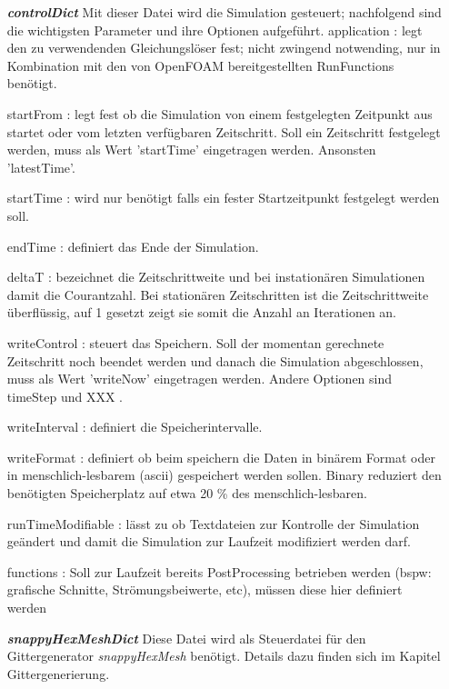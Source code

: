 \begin{itemize}
	
	\item[\textbf{\textit{controlDict}}] Mit dieser Datei wird die Simulation gesteuert; nachfolgend sind die wichtigsten Parameter und ihre Optionen aufgeführt.
		\subitem application : legt den zu verwendenden Gleichungslöser fest; nicht zwingend notwending, nur in Kombination mit den von OpenFOAM bereitgestellten RunFunctions benötigt.
		
		\subitem startFrom : legt fest ob die Simulation von einem festgelegten Zeitpunkt aus startet oder vom letzten verfügbaren Zeitschritt. Soll ein Zeitschritt festgelegt werden, muss als Wert 'startTime' eingetragen werden. Ansonsten 'latestTime'. 
		
		\subitem startTime : wird nur benötigt falls ein fester Startzeitpunkt festgelegt werden soll. 
		
		\subitem endTime : definiert das Ende der Simulation. 
		
		\subitem deltaT : bezeichnet die Zeitschrittweite und bei instationären Simulationen damit die Courantzahl. Bei stationären Zeitschritten ist die Zeitschrittweite überflüssig, auf 1 gesetzt zeigt sie somit die Anzahl an Iterationen an. 
		
		\subitem writeControl : steuert das Speichern. Soll der momentan gerechnete Zeitschritt noch beendet werden und danach die Simulation abgeschlossen, muss als Wert 'writeNow' eingetragen werden. Andere Optionen sind timeStep und XXX .
		
		\subitem writeInterval : definiert die Speicherintervalle.
		
		\subitem writeFormat : definiert ob beim speichern die Daten in binärem Format oder in menschlich-lesbarem (ascii) gespeichert werden sollen. Binary reduziert den benötigten Speicherplatz auf etwa 20 \% des menschlich-lesbaren.
		
		\subitem runTimeModifiable : lässt zu ob Textdateien zur Kontrolle der Simulation geändert und damit die Simulation zur Laufzeit modifiziert werden darf.
		
		\subitem functions : Soll zur Laufzeit bereits PostProcessing betrieben werden (bspw: grafische Schnitte, Strömungsbeiwerte, etc), müssen diese hier definiert werden
	
	\item[\textbf{\textit{snappyHexMeshDict}}] Diese Datei wird als Steuerdatei für den Gittergenerator \textit{snappyHexMesh} benötigt. Details dazu finden sich im Kapitel Gittergenerierung.
		

\end{itemize}

